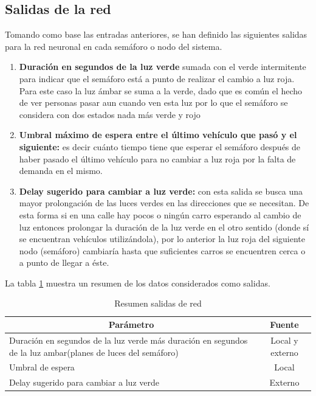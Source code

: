 \subsection{Salidas de la red}

Tomando como base las entradas anteriores, se han definido las siguientes salidas para la red neuronal en cada sem\'{a}foro o nodo del sistema.

\begin{enumerate}
	\item	\textbf{Duraci\'{o}n en segundos de la luz verde} sumada con el verde intermitente para indicar que el sem\'{a}foro est\'{a} a punto de realizar el cambio a luz roja. Para este caso la luz \'{a}mbar se suma a la verde, dado que es com\'{u}n el hecho de ver personas pasar aun cuando ven esta luz por lo que el sem\'{a}foro se considera con dos estados nada m\'{a}s verde y rojo

	\item \textbf{Umbral m\'{a}ximo de espera entre el \'{u}ltimo veh\'{i}culo que pas\'{o} y el siguiente:} es decir cu\'{a}nto tiempo tiene que esperar el sem\'{a}foro despu\'{e}s de haber pasado el \'{u}ltimo veh\'{i}culo para no cambiar a luz roja por la falta de demanda en el mismo.

	\item \textbf{Delay sugerido para cambiar a luz verde:} con esta salida se busca una mayor prolongaci\'{o}n de las luces verdes en las direcciones que se necesitan. De esta forma si en una calle hay pocos o ning\'{u}n carro esperando al cambio de luz entonces prolongar la duraci\'{o}n de la luz verde en el otro sentido (donde s\'{i} se encuentran veh\'{i}culos utiliz\'{a}ndola), por lo anterior la luz roja del siguiente nodo (sem\'{a}foro) cambiar\'{i}a hasta que suficientes carros se encuentren cerca o a punto de llegar a \'{e}ste.
 
\end{enumerate}

La tabla \ref{tab:nnoutputs} muestra un resumen de los datos considerados como salidas.

\begin{table}[H]
	\centering
	\begin{tabular}{p{8.5cm}|c}
		\multicolumn{1}{c}{\centering\textbf{Par\'{a}metro}} & \multicolumn{1}{c}{\centering\textbf{Fuente}}\\
		\hline
		\hline
		Duraci\'{o}n en segundos de la luz verde m\'{a}s duraci\'{o}n en segundos de la luz ambar(planes de luces del sem\'{a}foro) & Local y externo\\
		Umbral de espera & Local\\
		Delay sugerido para cambiar a luz verde & Externo\\
		\hline
	\end{tabular}
	\caption{Resumen salidas de red}
	\label{tab:nnoutputs}
\end{table}

